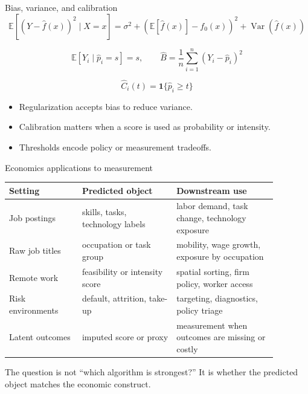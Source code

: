 \documentclass[aspectratio=169,11pt]{beamer}
\newcommand{\E}{\mathbb{E}}
\newcommand{\1}{\mathbf{1}}
\begin{document}
\begin{frame}{Bias, variance, and calibration}
\small
\[
\E\left[(Y-\widehat f(x))^2\mid X=x\right]
=
\sigma^2+
\left(\E[\widehat f(x)]-f_0(x)\right)^2+
\operatorname{Var}(\widehat f(x))
\]

\[
\E[Y_i\mid \widehat p_i=s]=s,
\qquad
\widehat B=\frac{1}{n}\sum_{i=1}^{n}(Y_i-\widehat p_i)^2
\]

\[
\widehat C_i(t)=\1\{\widehat p_i\geq t\}
\]

\begin{itemize}
    \item Regularization accepts bias to reduce variance.
    \item Calibration matters when a score is used as probability or intensity.
    \item Thresholds encode policy or measurement tradeoffs.
\end{itemize}
\end{frame}

\begin{frame}{Economics applications to measurement}
\small
\begin{tabular}{p{0.24\linewidth} p{0.31\linewidth} p{0.33\linewidth}}
\toprule
Setting & Predicted object & Downstream use \\
\midrule
Job postings & skills, tasks, technology labels & labor demand, task change, technology exposure \\
Raw job titles & occupation or task group & mobility, wage growth, exposure by occupation \\
Remote work & feasibility or intensity score & spatial sorting, firm policy, worker access \\
Risk environments & default, attrition, take-up & targeting, diagnostics, policy triage \\
Latent outcomes & imputed score or proxy & measurement when outcomes are missing or costly \\
\bottomrule
\end{tabular}

\medskip
The question is not ``which algorithm is strongest?'' It is whether the predicted object matches the economic construct.
\end{frame}
\end{document}
